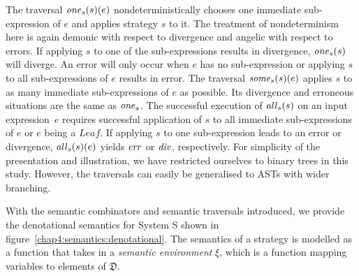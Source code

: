The traversal $\text{\textit{one}\/}_{s}(s)(e)$ nondeterministically chooses one immediate sub-expression of $e$ and applies strategy $s$ to it. The treatment of nondeterminism here is again demonic with respect to divergence and angelic with respect to errors.
If applying $s$ to one of the sub-expressions results in divergence, $\text{\textit{one}\/}_{s}(s)$ will diverge. An error will only occur when $e$ has no sub-expression or applying $s$ to all sub-expressions of $e$ results in error.
The traversal $\text{\textit{some}\/}_{s}(s)(e)$ applies $s$ to as many immediate sub-expressions of $e$ as possible. Its divergence and erroneous situations are the same as $\text{\textit{one}\/}_{s}$.
The successful execution of $\text{\textit{all}\/}_{s}(s)$ on an input expression~$e$ requires successful application of $s$ to all immediate sub-expressions of $e$ or $e$ being a $\mathit{Leaf}$. If applying $s$ to one sub-expression leads to an error or divergence, $\text{\textit{all}\/}_{s}(s)(e)$ yields $\mathit{err}$ or $\mathit{div}$, respectively.
For simplicity of the presentation and illustration, we have restricted ourselves to binary trees in this study. However, the traversals can easily be generalised to ASTs with wider branching.

With the semantic combinators and semantic traversals introduced, we provide the denotational semantics for System S shown in figure~\ref{chap4:semantics:denotational}. The semantics of a strategy is modelled as a function that takes in a \emph{semantic environment} $\xi$, which is a function mapping variables to elements of $\mathfrak{D}$.

